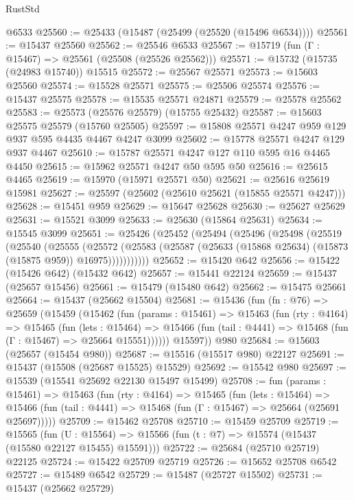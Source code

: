 \begin{lexlean}{RustStd}
\begin{coremodule}
    @6533
@25560 := @25433 (@15487 (@25499 (@25520 (@15496 @6534))))
@25561 := @15437 @25560
@25562 := @25546 @6533
@25567 := @15719 (fun (Γ : @15467) => @25561 (@25508 (@25526 @25562)))
@25571 := @15732 (@15735 (@24983 @15740)) @15515
@25572 := @25567 @25571
@25573 := @15603 @25560
@25574 := @15528 @25571
@25575 := @25506 @25574
@25576 := @15437 @25575
@25578 := @15535 @25571 @24871
@25579 := @25578 @25562
@25583 := @25573 (@25576 @25579) (@15755 @25432)
@25587 := @15603 @25575 @25579 (@15760 @25505)
@25597 := @15808 @25571 @4247 @959 @129 @937 @595 @4435 @4467 @4247 @3099
@25602 := @15778 @25571 @4247 @129 @937 @4467
@25610 := @15787 @25571 @4247 @127 @110 @595 @16 @4465 @4450
@25615 := @15962 @25571 @4247 @50 @595 @50
@25616 := @25615 @4465
@25619 := @15970 (@15971 @25571 @50)
@25621 := @25616 @25619 @15981
@25627 := @25597 (@25602 (@25610 @25621 (@15855 @25571 @4247)))
@25628 := @15451 @959
@25629 := @15647 @25628
@25630 := @25627 @25629
@25631 := @15521 @3099
@25633 := @25630 (@15864 @25631)
@25634 := @15545 @3099
@25651 := @25426
    (@25452
      (@25494
        (@25496
          (@25498
            (@25519
              (@25540
                (@25555
                  (@25572
                    (@25583 (@25587 (@25633 (@15868 @25634) (@15873 (@15875 @959)) @16975)))))))))))
@25652 := @15420 @642
@25656 := @15422 (@15426 @642) (@15432 @642)
@25657 := @15441 @22124
@25659 := @15437 (@25657 @15456)
@25661 := @15479 (@15480 @642)
@25662 := @15475 @25661
@25664 := @15437 (@25662 @15504)
@25681 := @15436
    (fun (fn : @76) =>
    @25659
      (@15459
        (@15462
          (fun (params : @15461) =>
          @15463
            (fun (rty : @4164) =>
            @15465
              (fun (lets : @15464) =>
              @15466 (fun (tail : @4441) => @15468 (fun (Γ : @15467) => @25664 @15551))))))
        @15597))
    @980
@25684 := @15603 (@25657 (@15454 @980))
@25687 := @15516 (@15517 @980) @22127
@25691 := @15437 (@15508 (@25687 @15525) @15529)
@25692 := @15542 @980
@25697 := @15539 (@15541 @25692 @22130 @15497 @15499)
@25708 := fun (params : @15461) =>
  @15463
    (fun (rty : @4164) =>
    @15465
      (fun (lets : @15464) =>
      @15466 (fun (tail : @4441) => @15468 (fun (Γ : @15467) => @25664 (@25691 @25697)))))
@25709 := @15462 @25708
@25710 := @15459 @25709
@25719 := @15565
    (fun (U : @15564) => @15566 (fun (t : @7) => @15574 (@15437 (@15580 @22127 @15455) @15591)))
@25722 := @25684 (@25710 @25719) @22125
@25724 := @15422 @25709 @25719
@25726 := @15652 @25708 @6542
@25727 := @15489 @6542
@25729 := @15487 (@25727 @15502)
@25731 := @15437 (@25662 @25729)

\end{coremodule}
\end{lexlean}
